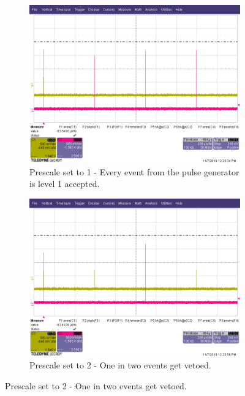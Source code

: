 \begin{figure}
    \centering
    \begin{subfigure}[t]{.5\textwidth}
      \includegraphics[width=1.0\linewidth]{2kHzPrescale1.png}
      \captionsetup{width=0.8\textwidth}
      \caption{Prescale set to 1 - Every event from the pulse generator is level 1 accepted.}
      \label{fig:2kHzPrescale1}
    \end{subfigure}%
    \begin{subfigure}[t]{.5\textwidth}
      \includegraphics[width=1.0\linewidth]{2kHzPrescale2.png}
      \captionsetup{width=0.8\textwidth}
      \caption{Prescale set to 2 - One in two events get vetoed.}
      \label{fig:2kHzPrescale2}
    \end{subfigure}

\end{figure}
